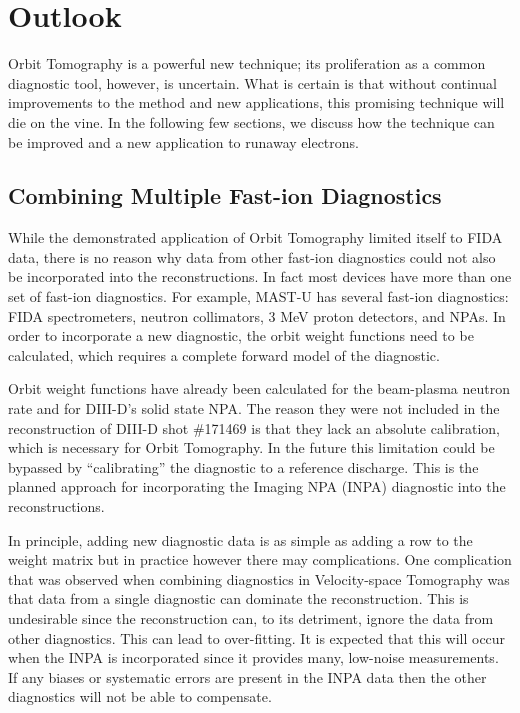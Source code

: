 \chapter{Outlook}\label{chap:outlook}

Orbit Tomography is a powerful new technique; its proliferation as a common diagnostic tool, however, is uncertain. What is certain is that without continual improvements to the method and new applications, this promising technique will die on the vine. In the following few sections, we discuss how the technique can be improved and a new application to runaway electrons.

\section{Combining Multiple Fast-ion Diagnostics}
While the demonstrated application of Orbit Tomography limited itself to FIDA data, there is no reason why data from other fast-ion diagnostics could not also be incorporated into the reconstructions. In fact most devices have more than one set of fast-ion diagnostics. For example, MAST-U has several fast-ion diagnostics: FIDA spectrometers, neutron collimators, 3 MeV proton detectors, and NPAs. In order to incorporate a new diagnostic, the orbit weight functions need to be calculated, which requires a complete forward model of the diagnostic.

Orbit weight functions have already been calculated for the beam-plasma neutron rate and for DIII-D's solid state NPA. The reason they were not included in the reconstruction of DIII-D shot \#171469 is that they lack an absolute calibration, which is necessary for Orbit Tomography. In the future this limitation could be bypassed by ``calibrating'' the diagnostic to a reference discharge. This is the planned approach for incorporating the Imaging NPA (INPA) diagnostic into the reconstructions.

In principle, adding new diagnostic data is as simple as adding a row to the weight matrix but in practice however there may complications. One complication that was observed when combining diagnostics in Velocity-space Tomography\cite{salewski2012,salewski2013_tomography,salewski2017mev,salewski2018bayesian} was that data from a single diagnostic can dominate the reconstruction. This is undesirable since the reconstruction can, to its detriment, ignore the data from other diagnostics. This can lead to over-fitting. It is expected that this will occur when the INPA is incorporated since it provides many, low-noise measurements. If any biases or systematic errors are present in the INPA data then the other diagnostics will not be able to compensate.

